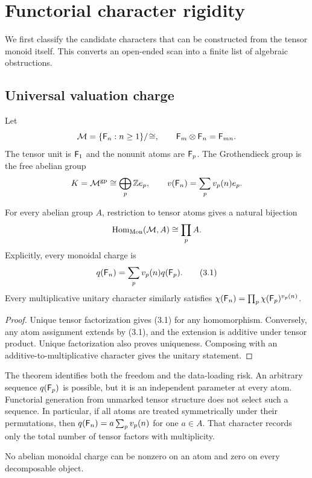 \section{Functorial character rigidity}
\label{sec:rigidity}

We first classify the candidate characters that can be constructed from the
tensor monoid itself.  This converts an open-ended scan into a finite list of
algebraic obstructions.

\subsection{Universal valuation charge}

Let
\[
  \mathcal M=\{\mathsf F_n:n\ge1\}/\!\cong,
  \qquad
  \mathsf F_m\otimes\mathsf F_n=\mathsf F_{mn}.
\]
The tensor unit is $\mathsf F_1$ and the nonunit atoms are $\mathsf F_p$.  The Grothendieck
group is the free abelian group
\[
  K=\mathcal M^{\mathrm{gp}}\cong\bigoplus_p\mathbb Z e_p,
  \qquad
  v(\mathsf F_n)=\sum_pv_p(n)e_p.
\]

\begin{theorem}
\label{thm:valuation}
For every abelian group $A$, restriction to tensor atoms gives a natural
bijection
\[
  \operatorname{Hom}_{\mathrm{Mon}}(\mathcal M,A)\cong\prod_p A.
\]
Explicitly, every monoidal charge is
\[
  q(\mathsf F_n)=\sum_pv_p(n)q(\mathsf F_p).
  \tag{3.1}
\]
Every multiplicative unitary character similarly satisfies
$\chi(\mathsf F_n)=\prod_p\chi(\mathsf F_p)^{v_p(n)}$.
\end{theorem}

\begin{proof}
Unique tensor factorization gives (3.1) for any homomorphism.  Conversely,
any atom assignment extends by (3.1), and the extension is additive under
tensor product.  Unique factorization also proves uniqueness.  Composing
with an additive-to-multiplicative character gives the unitary statement.
\end{proof}

The theorem identifies both the freedom and the data-loading risk.  An
arbitrary sequence $q(\mathsf F_p)$ is possible, but it is an independent parameter
at every atom.  Functorial generation from unmarked tensor structure does not
select such a sequence.  In particular, if all atoms are treated symmetrically
under their permutations, then $q(\mathsf F_n)=a\sum_pv_p(n)$ for one $a\in A$.
That character records only the total number of tensor factors with
multiplicity.

\begin{corollary}
\label{cor:prime-no-go}
No abelian monoidal charge can be nonzero on an atom and zero on every
decomposable object.
\end{corollary}

